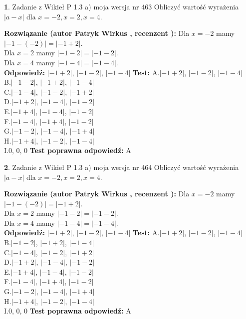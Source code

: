 \documentclass[12pt, a4paper]{article}
\theoremstyle{definition} %
\newtheorem{zad}{}
\newcommand{\zadStart}[1]{\begin{zad}#1\newline}
\newcommand{\zadStop}{\end{zad}}
\newcommand{\rozwStart}[2]{\noindent \textbf{Rozwiązanie (autor #1 , recenzent #2): }\newline}
\newcommand{\rozwStop}{\newline}
\newcommand{\odpStart}{\noindent \textbf{Odpowiedź:}\newline}
\newcommand{\odpStop}{\newline}
\newcommand{\testStart}{\noindent \textbf{Test:}\newline}
\newcommand{\testStop}{\newline}
\newcommand{\kluczStart}{\noindent \textbf{Test poprawna odpowiedź:}\newline}
\newcommand{\kluczStop}{\newline}
\begin{document}
\zadStart{Zadanie z Wikieł P 1.3 a) moja wersja nr 463}
Obliczyć wartość wyrażenia $|a - x|$ dla $x=-2,x=2,x=4$.
\zadStop
\rozwStart{Patryk Wirkus}{}
Dla $x = -2$ mamy $|-1 - (-2)| = |-1 + 2|$.\\
Dla $x = 2$ mamy $|-1 - 2| = |-1 - 2|$.\\
Dla $x = 4$ mamy $|-1 - 4| = |-1 - 4|$.\\
\rozwStop
\odpStart
$|-1 + 2|$, $|-1 - 2|$, $|-1 - 4|$
\odpStop
\testStart
A.$|-1 + 2|$, $|-1 - 2|$, $|-1 - 4|$\\
B.$|-1 - 2|$, $|-1 + 2|$, $|-1 - 4|$\\
C.$|-1 - 4|$, $|-1 - 2|$, $|-1 + 2|$\\
D.$|-1 + 2|$, $|-1 - 4|$, $|-1 - 2|$\\
E.$|-1 + 4|$, $|-1 - 4|$, $|-1 - 2|$\\
F.$|-1 - 4|$, $|-1 + 4|$, $|-1 - 2|$\\
G.$|-1 - 2|$, $|-1 - 4|$, $|-1 + 4|$\\
H.$|-1 + 4|$, $|-1 - 2|$, $|-1 - 4|$\\
I.$0$, $0$, $0$
\testStop
\kluczStart
A
\kluczStop



\zadStart{Zadanie z Wikieł P 1.3 a) moja wersja nr 464}
Obliczyć wartość wyrażenia $|a - x|$ dla $x=-2,x=2,x=4$.
\zadStop
\rozwStart{Patryk Wirkus}{}
Dla $x = -2$ mamy $|-1 - (-2)| = |-1 + 2|$.\\
Dla $x = 2$ mamy $|-1 - 2| = |-1 - 2|$.\\
Dla $x = 4$ mamy $|-1 - 4| = |-1 - 4|$.\\
\rozwStop
\odpStart
$|-1 + 2|$, $|-1 - 2|$, $|-1 - 4|$
\odpStop
\testStart
A.$|-1 + 2|$, $|-1 - 2|$, $|-1 - 4|$\\
B.$|-1 - 2|$, $|-1 + 2|$, $|-1 - 4|$\\
C.$|-1 - 4|$, $|-1 - 2|$, $|-1 + 2|$\\
D.$|-1 + 2|$, $|-1 - 4|$, $|-1 - 2|$\\
E.$|-1 + 4|$, $|-1 - 4|$, $|-1 - 2|$\\
F.$|-1 - 4|$, $|-1 + 4|$, $|-1 - 2|$\\
G.$|-1 - 2|$, $|-1 - 4|$, $|-1 + 4|$\\
H.$|-1 + 4|$, $|-1 - 2|$, $|-1 - 4|$\\
I.$0$, $0$, $0$
\testStop
\kluczStart
A
\kluczStop
\end{document}
